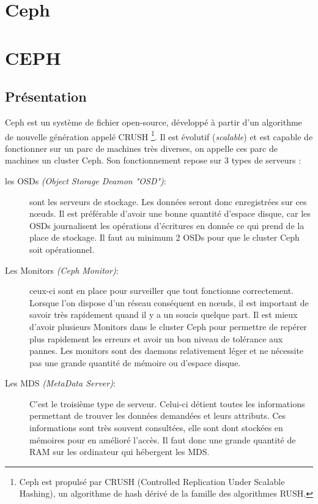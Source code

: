 \documentclass[12pt]{article}
\begin{document}
\section{Ceph}
\section{CEPH}
\subsection{Présentation}
	Ceph est un système de fichier open-source, développé à partir d'un algorithme de nouvelle
génération appelé CRUSH \footnote{Ceph est propulsé par CRUSH (Controlled Replication Under Scalable Hashing), un algorithme de hash dérivé de la famille des algorithmes RUSH.}. Il est évolutif (\textit{scalable}) et est capable de fonctionner sur un parc de machines très diverses, on appelle ces parc de machines un cluster Ceph. Son fonctionnement repose sur 3 types de serveurs :

\begin{description}
\item[les OSDs \textit{(Object Storage Deamon "OSD")}:] sont les serveurs de stockage. Les données seront donc enregistrées sur ces nœuds. Il est préférable d'avoir une bonne quantité d'espace disque, car les OSDs journalisent les opérations d'écritures en donnée ce qui prend de la place de stockage. Il faut au minimum 2 OSDs pour que le cluster Ceph soit opérationnel.
 \item[Les Monitors \textit{(Ceph Monitor)}:] ceux-ci sont en place pour surveiller que tout fonctionne correctement. Lorsque l'on dispose d'un réseau conséquent en nœuds, il est important de savoir très rapidement quand il y a un soucis quelque part. Il est mieux d'avoir plusieurs Monitors dans le cluster Ceph pour permettre de repérer plus rapidement les erreurs et avoir un bon niveau de tolérance aux pannes. Les monitors sont des daemons relativement léger et ne nécessite pas une grande quantité de mémoire ou d'espace disque.
\item[Les MDS \textit{(MetaData Server)}:] C'est le troisième type de serveur. Celui-ci détient toutes les informations permettant de trouver les données demandées et leurs attributs. Ces informations sont très souvent consultées, elle sont dont stockées en mémoires pour en amélioré l'accès. Il faut donc une grande quantité de RAM sur les ordinateur qui hébergent les MDS.
\end{description}
\end{document}
